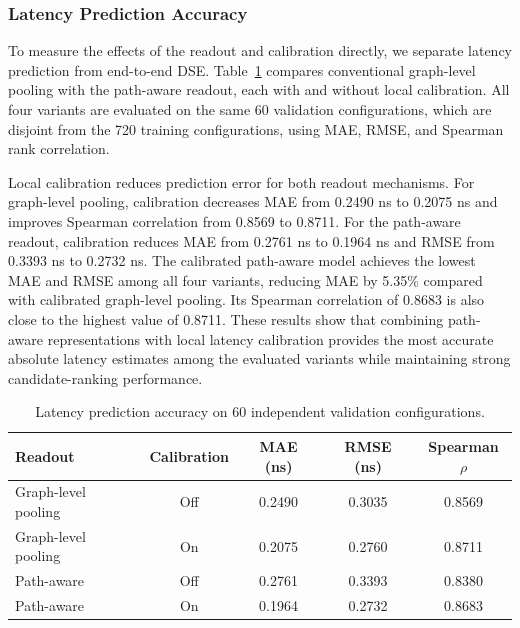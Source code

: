\subsubsection{Latency Prediction Accuracy}

To measure the effects of the readout and calibration directly, we separate latency prediction from end-to-end DSE. Table~\ref{tab:latency_prediction_ablation} compares conventional graph-level pooling with the path-aware readout, each with and without local calibration. All four variants are evaluated on the same 60 validation configurations, which are disjoint from the 720 training configurations, using MAE, RMSE, and Spearman rank correlation.


Local calibration reduces prediction error for both readout mechanisms. For graph-level pooling, calibration decreases MAE from 0.2490 ns to 0.2075 ns and improves Spearman correlation from 0.8569 to 0.8711. For the path-aware readout, calibration reduces MAE from 0.2761 ns to 0.1964 ns and RMSE from 0.3393 ns to 0.2732 ns. The calibrated path-aware model achieves the lowest MAE and RMSE among all four variants, reducing MAE by 5.35\% compared with calibrated graph-level pooling. Its Spearman correlation of 0.8683 is also close to the highest value of 0.8711. These results show that combining path-aware representations with local latency calibration provides the most accurate absolute latency estimates among the evaluated variants while maintaining strong candidate-ranking performance.


\begin{table}[t]
\centering
\caption{Latency prediction accuracy on 60 independent validation configurations.}
\label{tab:latency_prediction_ablation}
\footnotesize

\setlength{\tabcolsep}{4pt}
\begin{tabular*}{\columnwidth}{@{\extracolsep{\fill}}lcccc@{}}
\toprule
Readout & Calibration & MAE (ns) & RMSE (ns) & Spearman $\rho$ \\
\midrule
Graph-level pooling & Off & 0.2490 & 0.3035 & 0.8569 \\
Graph-level pooling & On  & 0.2075 & 0.2760 & 0.8711 \\
Path-aware          & Off & 0.2761 & 0.3393 & 0.8380 \\
Path-aware          & On  & 0.1964 & 0.2732 & 0.8683 \\
\bottomrule
\end{tabular*}
\end{table}



